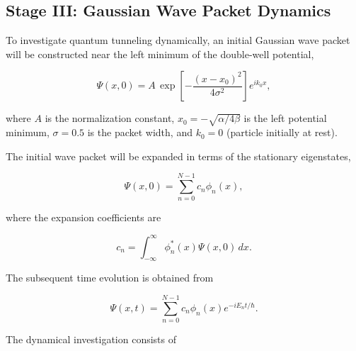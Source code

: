 \documentclass[11pt,a4paper]{article}
\begin{document}
\subsection{Stage III: Gaussian Wave Packet Dynamics}

To investigate quantum tunneling dynamically, an initial Gaussian wave packet will be constructed near the left minimum of the double-well potential,

\begin{equation}
\Psi(x,0)
=
A\,
\exp\!\left[
-\frac{(x-x_0)^2}{4\sigma^2}
\right]
e^{ik_0x},
\end{equation}

where $A$ is the normalization constant, $x_0=-\sqrt{\alpha/4\beta}$ is the left potential minimum, $\sigma=0.5$ is the packet width, and $k_0=0$ (particle initially at rest).

The initial wave packet will be expanded in terms of the stationary eigenstates,

\begin{equation}
\Psi(x,0)=\sum_{n=0}^{N-1} c_n\phi_n(x),
\end{equation}

where the expansion coefficients are

\begin{equation}
c_n
=
\int_{-\infty}^{\infty}
\phi_n^*(x)\Psi(x,0)\,dx.
\end{equation}

The subsequent time evolution is obtained from

\begin{equation}
\Psi(x,t)
=
\sum_{n=0}^{N-1}
c_n
\phi_n(x)
e^{-iE_nt/\hbar}.
\end{equation}

The dynamical investigation consists of
\end{document}
